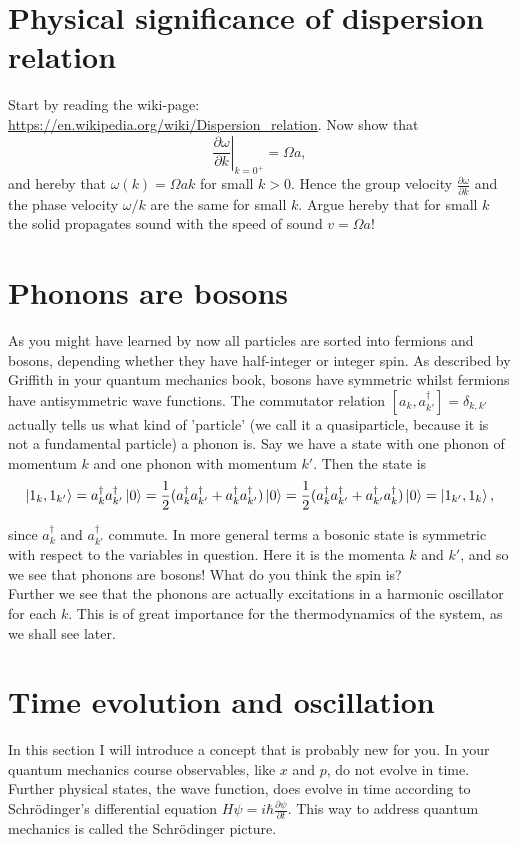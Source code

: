 \documentclass[10pt]{article}
\begin{document}
\section{Physical significance of dispersion relation}
Start by reading the wiki-page: \url{https://en.wikipedia.org/wiki/Dispersion_relation}. Now show that
\begin{equation}
\left.\frac{\partial \omega}{\partial k}\right|_{k=0^+} = \Omega a, 
\end{equation}
and hereby that $\omega(k) =  \Omega ak$ for small $k>0$. Hence the group velocity $\frac{\partial \omega}{\partial k}$ and the phase velocity $\omega/k$ are the same for small $k$. Argue hereby that for small $k$ the solid propagates sound with the speed of sound $v=\Omega a$!

\section{Phonons are bosons}
As you might have learned by now all particles are sorted into fermions and bosons, depending whether they have half-integer or integer spin. As described by Griffith in your quantum mechanics book, bosons have symmetric whilst fermions have antisymmetric wave functions. The commutator relation $[a_k,a_{k'}^\dagger]=\delta_{k,k'}$ actually tells us what kind of 'particle' (we call it a quasiparticle, because it is not a fundamental particle) a phonon is. Say we have a state with one phonon of momentum $k$ and one phonon with momentum $k'$. Then the state is
\begin{equation}
\ket{1_k,1_{k'}} = a_k^\dagger a_{k'}^\dagger\ket{0} = \frac{1}{2}(a_k^\dagger a_{k'}^\dagger+a_k^\dagger a_{k'}^\dagger)\ket{0} = \frac{1}{2}(a_k^\dagger a_{k'}^\dagger+a_{k'}^\dagger a_{k}^\dagger)\ket{0} = \ket{1_{k'},1_k},
\end{equation}

since $a_k^\dagger$ and $a_{k'}^\dagger$ commute. In more general terms a bosonic state is symmetric with respect to the variables in question. Here it is the momenta $k$ and $k'$, and so we see that phonons are bosons! What do you think the spin is? \\

Further we see that the phonons are actually excitations in a harmonic oscillator for each $k$. This is of great importance for the thermodynamics of the system, as we shall see later. 

\section{Time evolution and oscillation}
In this section I will introduce a concept that is probably new for you. In your quantum mechanics course observables, like $x$ and $p$, do not evolve in time. Further physical states, the wave function, does evolve in time according to Schrödinger's differential equation $H\psi = i\hbar \frac{\partial \psi}{\partial t}$. This way to address quantum mechanics is called the Schrödinger picture. \\
\end{document}
